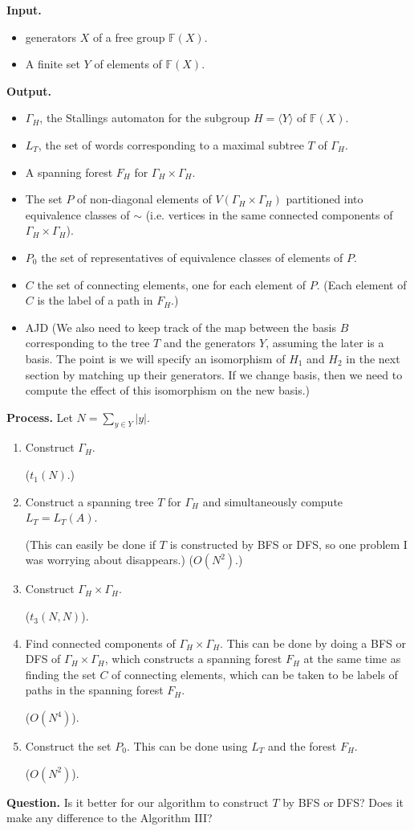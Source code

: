 \documentclass[a4paper,12pt]{article}
\newcommand{\G}{\Gamma }
\numberwithin{equation}{section}
\numberwithin{figure}{section}
\newcommand{\FF}{\ensuremath{\mathbb{F}}}
\newcommand{\la}{\langle}
\newcommand{\ra}{\rangle}
\newcommand{\be}{\begin{enumerate}}
\newcommand{\ee}{\end{enumerate}}
\newcommand{\biz}{\begin{itemize}}
\newcommand{\eiz}{\end{itemize}}
\newenvironment{ajd1}{\noindent\color{red} AJD }{}
\newcommand{\ajd}[1]{\begin{ajd1} #1 \end{ajd1}}
\begin{document}
\noindent\textbf{Input.}
\biz
\item generators $X$ of a free group $\FF(X)$.
\item A finite set $Y$ of elements of $\FF(X)$.
\eiz
\noindent\textbf{Output.}
\biz
\item
$\G_H$, the Stallings automaton for the subgroup $H=\la Y\ra$ of $\FF(X)$.
\item
$L_T$, the set of words corresponding to a  maximal subtree $T$ of $\G_H$.
\item A spanning forest $F_H$ for $\G_H\times \G_H$. 
\item The set $P$ of non-diagonal elements of $V( \G_H\times \G_H)$
partitioned into equivalence classes of $\sim$ (i.e. vertices in the
same connected components of $\G_H\times \G_H$).
\item $P_0$ the set of representatives of equivalence classes of
elements of $P$.
\item $C$ the set of connecting elements, one for each element of $P$.
(Each element of $C$ is the label of a path in $F_H$.) 
\item \ajd{(We also need to keep track of the map between the basis $B$ corresponding to the tree $T$ and the generators $Y$, assuming the later is a basis. 
The point is we will specify an isomorphism of $H_1$ and $H_2$ in the
next section by matching up their generators. If we change basis, then
we need to compute the effect of this isomorphism on the new basis.)}
\eiz
\noindent\textbf{Process.}
Let $N=\sum_{y\in Y} |y|$.
\be[{A}1]
\item Construct $\G_H$.
\begin{comp}
($t_1(N)$.)
\end{comp}
\item Construct a spanning tree $T$ for $\G_H$ and simultaneously
compute $L_T=L_T(A)$.
\begin{comp}
(This can easily be done if $T$ is constructed by
BFS or DFS, so one problem I was worrying about disappears.) ($O(N^2)$.)
\end{comp}
\item Construct $\G_H\times \G_H$.
\begin{comp}
($t_3(N,N)$).
\end{comp}
\item Find connected components of $\G_H\times \G_H$. This can be
done by doing a BFS or DFS of $\G_H\times \G_H$, which constructs
a spanning forest $F_H$ at the same time as finding the set $C$ of
connecting elements,
which can be taken to be labels of paths in the spanning forest $F_H$.
\begin{comp}
($O(N^4)$).
\end{comp}
\item Construct the set $P_0$. This can be done using $L_T$ and
the forest $F_H$.
\begin{comp}
($O(N^2)$).
\end{comp}
\ee
\begin{comp}\noindent\textbf{Question.} Is it better for our algorithm
to construct $T$ by BFS or DFS? Does it make any difference to the
Algorithm III?
\end{comp}
\end{document}
